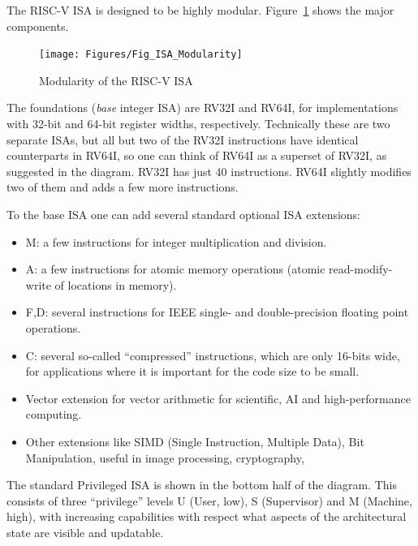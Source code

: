 \vspace{2ex}

The RISC-V ISA is designed to be highly modular.
Figure~\ref{Fig_ISA_Modularity} shows the major components.
\begin{figure}[htbp]
  \centerline{\texttt{[image: Figures/Fig\_ISA\_Modularity]}}
  \caption{\label{Fig_ISA_Modularity} Modularity of the RISC-V ISA}
\end{figure}
The foundations (\emph{base} integer ISA) are RV32I and RV64I, for
implementations with 32-bit and 64-bit register widths, respectively.
Technically these are two separate ISAs, but all but two of the RV32I
instructions have identical counterparts in RV64I, so one can think of
RV64I as a superset of RV32I, as suggested in the diagram.  RV32I has
just 40 instructions.  RV64I slightly modifies two of them and adds a
few more instructions.

To the base ISA one can add several standard optional ISA extensions:

\begin{itemize}

  \item M: a few instructions for integer multiplication and division.

  \item A: a few instructions for atomic memory operations (atomic
        read-modify-write of locations in memory).

  \item F,D: several instructions for IEEE single- and
        double-precision floating point operations.

  \item C: several so-called ``compressed'' instructions, which are
        only 16-bits wide, for applications where it is important for
        the code size to be small.

  \item Vector extension for vector arithmetic for scientific, AI and
        high-performance computing.

  \item Other extensions like SIMD (Single Instruction, Multiple
        Data), Bit Manipulation, useful in image processing,
        cryptography, {\etc}

\end{itemize}

The standard Privileged ISA is shown in the bottom half of the
diagram.  This consists of three ``privilege'' levels U (User, low), S
(Supervisor) and M (Machine, high), with increasing capabilities with
respect what aspects of the architectural state are visible and
updatable.

